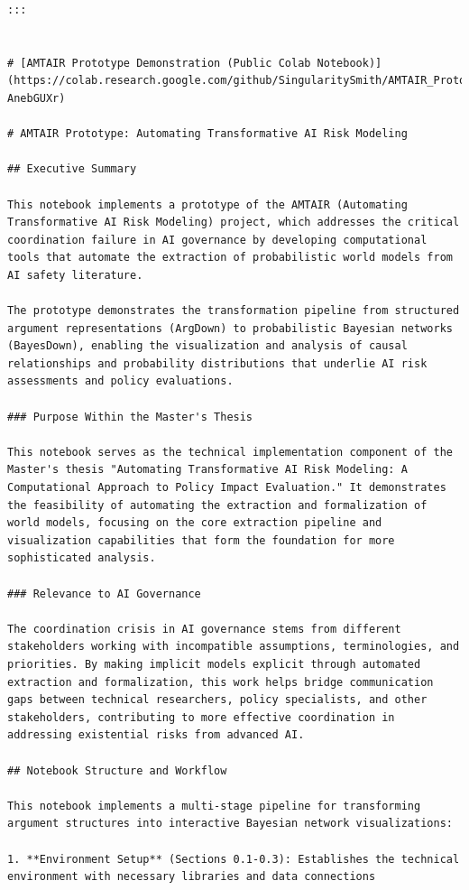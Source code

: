 \documentclass[
  11pt,
  letterpaper,
]{book}
\begin{document}
\begin{verbatim}
:::


# [AMTAIR Prototype Demonstration (Public Colab Notebook)](https://colab.research.google.com/github/SingularitySmith/AMTAIR_Prototype/blob/main/version_history/AMTAIR_Prototype_0_1.3.ipynb#scrollTo=lt8-AnebGUXr)

# AMTAIR Prototype: Automating Transformative AI Risk Modeling

## Executive Summary

This notebook implements a prototype of the AMTAIR (Automating Transformative AI Risk Modeling) project, which addresses the critical coordination failure in AI governance by developing computational tools that automate the extraction of probabilistic world models from AI safety literature.

The prototype demonstrates the transformation pipeline from structured argument representations (ArgDown) to probabilistic Bayesian networks (BayesDown), enabling the visualization and analysis of causal relationships and probability distributions that underlie AI risk assessments and policy evaluations.

### Purpose Within the Master's Thesis

This notebook serves as the technical implementation component of the Master's thesis "Automating Transformative AI Risk Modeling: A Computational Approach to Policy Impact Evaluation." It demonstrates the feasibility of automating the extraction and formalization of world models, focusing on the core extraction pipeline and visualization capabilities that form the foundation for more sophisticated analysis.

### Relevance to AI Governance

The coordination crisis in AI governance stems from different stakeholders working with incompatible assumptions, terminologies, and priorities. By making implicit models explicit through automated extraction and formalization, this work helps bridge communication gaps between technical researchers, policy specialists, and other stakeholders, contributing to more effective coordination in addressing existential risks from advanced AI.

## Notebook Structure and Workflow

This notebook implements a multi-stage pipeline for transforming argument structures into interactive Bayesian network visualizations:

1. **Environment Setup** (Sections 0.1-0.3): Establishes the technical environment with necessary libraries and data connections


\end{verbatim}
\end{document}

